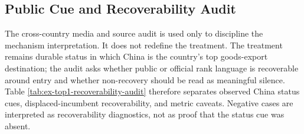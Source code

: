 \documentclass[
  12pt,
]{article}
\begin{document}
\subsection{Public Cue and Recoverability Audit}\label{public-cue-and-recoverability-audit}

The cross-country media and source audit is used only to discipline the mechanism interpretation. It does not redefine the treatment. The treatment remains durable status in which China is the country's top goods-export destination; the audit asks whether public or official rank language is recoverable around entry and whether non-recovery should be read as meaningful silence. Table \ref{tab:ex-top1-recoverability-audit} therefore separates observed China status cues, displaced-incumbent recoverability, and metric caveats. Negative cases are interpreted as recoverability diagnostics, not as proof that the status cue was absent.

\begingroup\fontsize{7}{9}\selectfont
\end{document}
